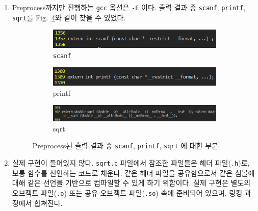 \begin{enumerate}[label= (\alph*)]
    \item {
        Preprocess까지만 진행하는 \texttt{gcc} 옵션은 \texttt{-E} 이다.
        출력 결과 중 \texttt{scanf}, \texttt{printf}, \texttt{sqrt}를 Fig.~\ref{fig:1-2}와 같이 찾을 수 있었다.

        \begin{figure}[t]
            \centering
            \begin{subfigure}[t]{0.48\textwidth}
                \centering
                \includegraphics[width=\textwidth]{imgs/Figure02_scanf.png}
                \caption{\texttt{scanf}}
                \label{fig:scanf declaration}
            \end{subfigure}
            \hfill
            \begin{subfigure}[t]{0.48\textwidth}
                \centering
                \includegraphics[width=\textwidth]{imgs/Figure03_printf.png}
                \caption{printf}
                \label{fig:printf declaration}
            \end{subfigure}
            \hfill
            \begin{subfigure}[t]{\textwidth}
                \centering
                \includegraphics[width=\textwidth]{imgs/Figure04_sqrt.png}
                \caption{sqrt}
                \label{fig:sqrt declaration}
            \end{subfigure}
            \caption{
                Preprocess된 출력 결과 중 \texttt{scanf}, \texttt{printf}, \texttt{sqrt}
                에 대한 부분
            }
            \label{fig:1-2}
       \end{figure}
    }

    \item {
        실제 구현이 들어있지 않다. \texttt{sqrt.c} 파일에서 참조한 파일들은 헤더 파일(\texttt{.h})로,
        보통 함수를 선언하는 코드로 채운다. 같은 헤더 파일을 공유함으로서 같은 심볼에 대해 같은 선언을 기반으로
        컴파일할 수 있게 하기 위함이다. 실제 구현은 별도의 오브젝트 파일(\texttt{.o}) 또는
        공유 오브젝트 파일(\texttt{.so}) 속에 준비되어 있으며, 링킹 과정에서 합쳐진다.
    }
    
\end{enumerate}


